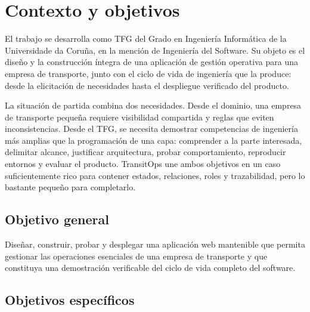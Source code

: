 \chapter{Contexto y objetivos}

El trabajo se desarrolla como TFG del Grado en Ingeniería Informática de la Universidade da Coruña, en la mención de Ingeniería del Software. Su objeto es el diseño y la construcción íntegra de una aplicación de gestión operativa para una empresa de transporte, junto con el ciclo de vida de ingeniería que la produce: desde la elicitación de necesidades hasta el despliegue verificado del producto.

La situación de partida combina dos necesidades. Desde el dominio, una empresa de transporte pequeña requiere visibilidad compartida y reglas que eviten inconsistencias. Desde el TFG, se necesita demostrar competencias de ingeniería más amplias que la programación de una capa: comprender a la parte interesada, delimitar alcance, justificar arquitectura, probar comportamiento, reproducir entornos y evaluar el producto. TransitOps une ambos objetivos en un caso suficientemente rico para contener estados, relaciones, roles y trazabilidad, pero lo bastante pequeño para completarlo.

\section{Objetivo general}

Diseñar, construir, probar y desplegar una aplicación web mantenible que permita gestionar las operaciones esenciales de una empresa de transporte y que constituya una demostración verificable del ciclo de vida completo del software.

\section{Objetivos específicos}

